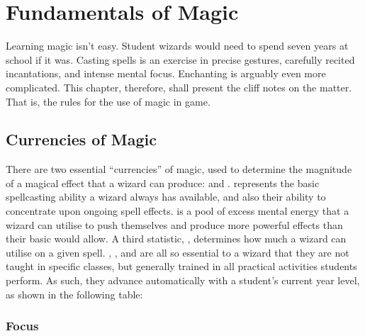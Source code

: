 \chapter{Fundamentals of Magic}

Learning magic isn't easy.
Student wizards would need to spend seven years at school if it was.
Casting spells is an exercise in precise gestures, carefully recited incantations, and intense mental focus.
Enchanting is arguably even more complicated.
This chapter, therefore, shall present the cliff notes on the matter. %
That is, the rules for the use of magic in game.

\section{Currencies of Magic}

There are two essential ``currencies'' of magic, used to determine the magnitude of a magical effect that a wizard can produce: {\focus} and {\mana}.
\capital{\focus} represents the basic spellcasting ability a wizard always has available, and also their ability to concentrate upon ongoing spell effects.
\capital{\mana} is a pool of excess mental energy that a wizard can utilise to push themselves and produce more powerful effects than their basic {\focus} would allow.
A third statistic, {\overchannel}, determines how much {\mana} a wizard can utilise on a given spell.
\capital{\focus}, {\mana}, and {\overchannel} are all so essential to a wizard that they are not taught in specific classes, but generally trained in all practical activities students perform.
As such, they advance automatically with a student's current year level, as shown in the following table:

\subsection{Focus}


